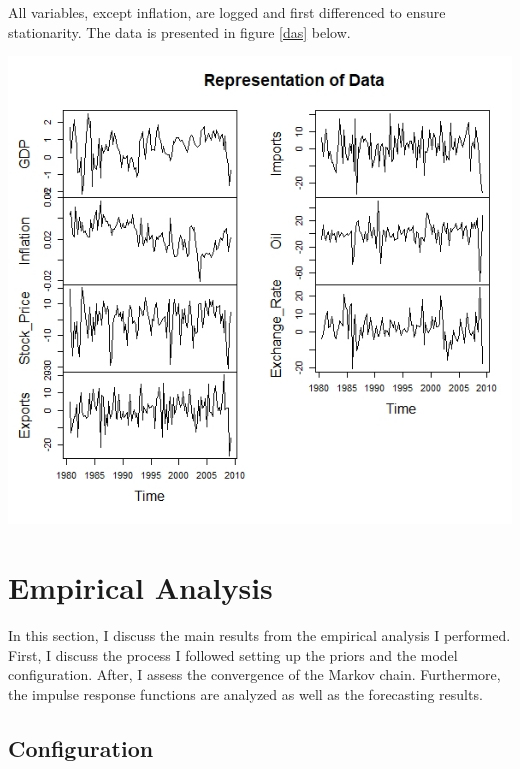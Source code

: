 \documentclass[11pt,preprint, authoryear]{elsarticle}
\let\origfigure\figure
\let\endorigfigure\endfigure
\renewenvironment{figure}[1][2] {
    \expandafter\origfigure\expandafter[H]
} {
    \endorigfigure
}
\numberwithin{equation}{section}
\numberwithin{figure}{section}
\numberwithin{table}{section}
\begin{document}
All variables, except inflation, are logged and first differenced to
ensure stationarity. The data is presented in figure \ref{das} below.

\begin{figure}[h]
\centering
\includegraphics[width=\linewidth]{repdata.jpg}
\caption{Represention of Data}
\label{das}
\end{figure}

\hypertarget{empirical-analysis}{%
\section{Empirical Analysis}\label{empirical-analysis}}

In this section, I discuss the main results from the empirical analysis
I performed. First, I discuss the process I followed setting up the
priors and the model configuration. After, I assess the convergence of
the Markov chain. Furthermore, the impulse response functions are
analyzed as well as the forecasting results.

\hypertarget{configuration}{%
\subsection{Configuration}\label{configuration}}
\end{document}
